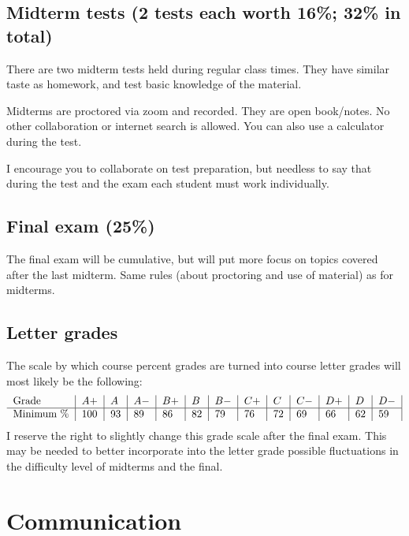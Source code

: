 \documentclass[oneside,11pt]{amsart}
\begin{document}
\subsection{Midterm tests (2 tests each worth 16\%; 32\% in total)}

There are two midterm tests
held
during regular class times.
They have
similar taste as homework, and test basic knowledge of the material.

Midterms are proctored via zoom and recorded.
They are open book/notes. No other collaboration or internet search is allowed. 
You can also use a calculator during the test.

I encourage you to collaborate on test preparation, but needless to say that
during the test and the exam each student must work individually.

\subsection{Final exam (25\%)}

The final exam will be cumulative, but will put more focus 
on topics covered after the last midterm.
Same rules (about proctoring and use of material) as for midterms.

\subsection*{Letter grades}

The scale by which course percent grades are turned into course letter grades
will most likely be the following:
\begin{equation*}
	\begin{tabular}{l|l|l|l|l|l|l|l|l|l|l|l|l|}
		Grade      & $ A+	$ & $A	$ & $A-	$ & $B+	$ & $B	$ & $B-	$ & $C+	$ & $C	$ & $C-	$ & $D+	$ & $D	$ & $D-$ \\
		\hline
		Minimum \% & 100     & 93   & 89    & 86    & 82    & 79    & 76    & 72    & 69    & 66    & 62    & 59
	\end{tabular}
\end{equation*}
I reserve the right to slightly change this grade scale after the
final exam.
This may be needed
to better incorporate into the letter grade
possible fluctuations in the difficulty level of 
midterms and the final.

\section{Communication}
\label{comm}
\end{document}
